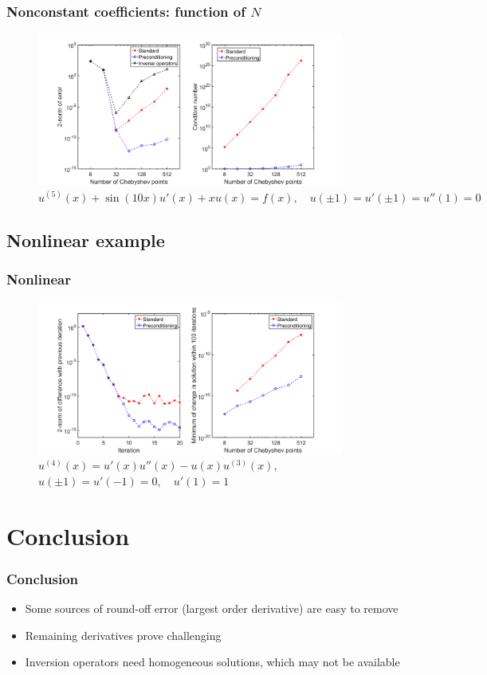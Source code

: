 \documentclass{beamer}
\begin{document}
\begin{frame}
\frametitle{Nonconstant coefficients: function of $N$}
\begin{figure}
\includegraphics[width=0.9\textwidth]{example_Wang5th_N.png}
\caption{$u^{(5)}(x) + \sin(10x) u'(x) + x u(x) = f(x), \quad u(\pm 1) = u'(\pm 1) = u''(1) = 0$}
\end{figure}
\end{frame}

\subsection{Nonlinear example}

\begin{frame}
\frametitle{Nonlinear}
\begin{figure}
\includegraphics[width=0.9\textwidth]{example_AscherNonlinear.png}
\caption{ $u^{(4)}(x) = u'(x) u''(x) - u(x) u^{(3)}(x)$, $ u(\pm 1) = u'(-1) = 0, \quad u'(1) = 1 $}
\end{figure}
\end{frame}

\section{Conclusion}

\begin{frame}
\frametitle{Conclusion}
\begin{itemize}
\item Some sources of round-off error (largest order derivative) are easy to remove
\item Remaining derivatives prove challenging
\item Inversion operators need homogeneous solutions, which may not be available
\end{itemize}
\end{frame}
\end{document}
